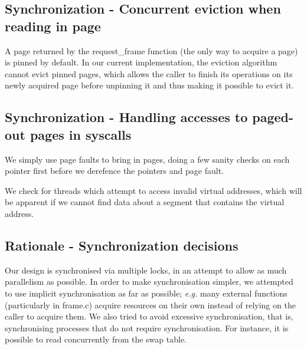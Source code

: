 \subsection{Synchronization - Concurrent eviction when reading in page}

A page returned by the request_frame function (the only way to acquire a page) is pinned by default.
In our current implementation, the eviction algorithm cannot evict pinned pages, which allows the caller to finish its operations on its newly acquired page before unpinning it and thus making it possible to evict it.

\subsection{Synchronization - Handling accesses to paged-out pages in syscalls}


We simply use page faults to bring in pages, doing a few sanity checks on each
pointer first before we derefence the pointers and page fault.

We check for threads which attempt to access invalid virtual addresses, which
will be apparent if we cannot find data about a segment that contains the
virtual address.

\subsection{Rationale - Synchronization decisions}

Our design is synchronised via multiple locks, in an attempt to allow as much parallelism as possible.
In order to make synchronisation simpler, we attempted to use implicit synchronisation as far as possible; \textit{e.g.} many external functions (particularly in frame.c) acquire resources on their own instead of relying on the caller to acquire them.
We also tried to avoid excessive synchronisation, that is, synchronising processes that do not require synchronisation. For instance, it is possible to read concurrently from the swap table.

